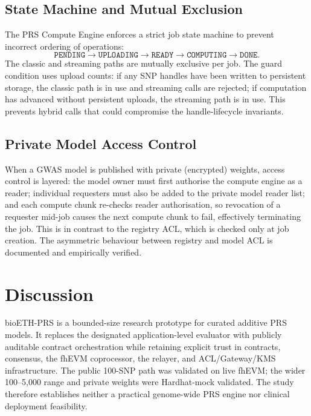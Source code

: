 \documentclass[10pt,twocolumn]{article}
\begin{document}
\subsection{State Machine and Mutual Exclusion}

The PRS Compute Engine enforces a strict job state machine to prevent incorrect
ordering of operations:
\begin{equation*}
\texttt{PENDING} \!\to\! \texttt{UPLOADING}
\!\to\! \texttt{READY}
\!\to\! \texttt{COMPUTING} \!\to\! \texttt{DONE}.
\end{equation*}
The classic and streaming paths are mutually exclusive per job.  The guard condition
uses upload counts: if any SNP handles have been written to persistent storage, the
classic path is in use and streaming calls are rejected; if computation has advanced
without persistent uploads, the streaming path is in use.  This prevents hybrid
calls that could compromise the handle-lifecycle invariants.

\subsection{Private Model Access Control}

When a GWAS model is published with private (encrypted) weights, access control is
layered: the model owner must first authorise the compute engine as a reader; individual
requesters must also be added to the private model reader list; and each compute chunk
re-checks reader authorisation, so revocation of a requester mid-job causes the next
compute chunk to fail, effectively terminating the job.  This is in contrast to the
registry ACL, which is checked only at job creation.  The asymmetric behaviour between
registry and model ACL is documented and empirically verified.

\section{Discussion}
\label{sec:discussion}

bioETH-PRS is a bounded-size research prototype for curated additive PRS models.  It
replaces the designated application-level evaluator with publicly auditable contract
orchestration while retaining explicit trust in contracts, consensus, the fhEVM
coprocessor, the relayer, and ACL/Gateway/KMS infrastructure.  The public 100-SNP path
was validated on live fhEVM; the wider 100--5,000 range and private weights were
Hardhat-mock validated.  The study therefore establishes neither a practical
genome-wide PRS engine nor clinical deployment feasibility.
\end{document}
